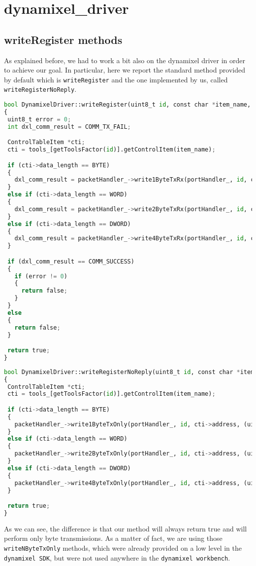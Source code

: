 \section*{dynamixel\_driver}
\subsection*{writeRegister methods}
As explained before, we had to work a bit also on the dynamixel driver in order to achieve our goal. In particular, here we report the standard method provided by default which is \texttt{writeRegister} and the one implemented by us, called \texttt{writeRegisterNoReply}.
\begin{lstlisting}[caption={Write Register Method},label={lst:write},language=Python]
bool DynamixelDriver::writeRegister(uint8_t id, const char *item_name, int32_t data)
{
 uint8_t error = 0;
 int dxl_comm_result = COMM_TX_FAIL;

 ControlTableItem *cti;
 cti = tools_[getToolsFactor(id)].getControlItem(item_name);

 if (cti->data_length == BYTE)
 {
   dxl_comm_result = packetHandler_->write1ByteTxRx(portHandler_, id, cti->address, (uint8_t)data, &error);
 }
 else if (cti->data_length == WORD)
 {
   dxl_comm_result = packetHandler_->write2ByteTxRx(portHandler_, id, cti->address, (uint16_t)data, &error);
 }
 else if (cti->data_length == DWORD)
 {
   dxl_comm_result = packetHandler_->write4ByteTxRx(portHandler_, id, cti->address, (uint32_t)data, &error);
 }

 if (dxl_comm_result == COMM_SUCCESS)
 {
   if (error != 0)
   {
     return false;
   }
 }
 else
 {
   return false;
 }

 return true;
}
\end{lstlisting}
\begin{lstlisting}[caption={Write Register No Reply Method},label={lst:writeregno},language=Python]
bool DynamixelDriver::writeRegisterNoReply(uint8_t id, const char *item_name, int32_t data)
{
 ControlTableItem *cti;
 cti = tools_[getToolsFactor(id)].getControlItem(item_name);

 if (cti->data_length == BYTE)
 {
   packetHandler_->write1ByteTxOnly(portHandler_, id, cti->address, (uint8_t)data);
 }
 else if (cti->data_length == WORD)
 {
   packetHandler_->write2ByteTxOnly(portHandler_, id, cti->address, (uint16_t)data);
 }
 else if (cti->data_length == DWORD)
 {
   packetHandler_->write4ByteTxOnly(portHandler_, id, cti->address, (uint32_t)data);
 }

 return true;
}
\end{lstlisting}
As we can see, the difference is that our method will always return true and will perform only byte transmissions. As a matter of fact, we are using those \texttt{writeNByteTxOnly} methods, which were already provided on a low level in the \texttt{dynamixel SDK}, but were not used anywhere in the \texttt{dynamixel workbench}.
